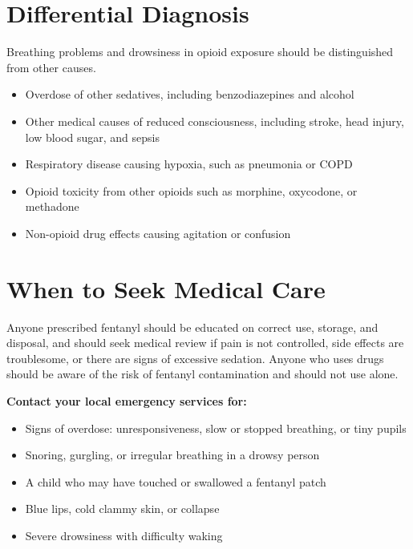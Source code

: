 \section*{Differential Diagnosis}
Breathing problems and drowsiness in opioid exposure should be distinguished from other causes.
\begin{itemize}
    \item Overdose of other sedatives, including benzodiazepines and alcohol
    \item Other medical causes of reduced consciousness, including stroke, head injury, low blood sugar, and sepsis
    \item Respiratory disease causing hypoxia, such as pneumonia or COPD
    \item Opioid toxicity from other opioids such as morphine, oxycodone, or methadone
    \item Non-opioid drug effects causing agitation or confusion
\end{itemize}

\section*{When to Seek Medical Care}
Anyone prescribed fentanyl should be educated on correct use, storage, and disposal, and should seek medical review if pain is not controlled, side effects are troublesome, or there are signs of excessive sedation. Anyone who uses drugs should be aware of the risk of fentanyl contamination and should not use alone.

\textbf{Contact your local emergency services for:}
\begin{itemize}
    \item Signs of overdose: unresponsiveness, slow or stopped breathing, or tiny pupils
    \item Snoring, gurgling, or irregular breathing in a drowsy person
    \item A child who may have touched or swallowed a fentanyl patch
    \item Blue lips, cold clammy skin, or collapse
    \item Severe drowsiness with difficulty waking
\end{itemize}

